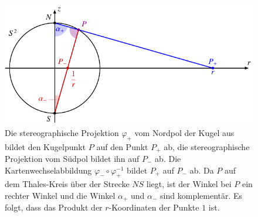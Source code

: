 %
%
%
\begin{figure}
\centering
\includegraphics{chapters/020-koordinaten/images/stereowechsel.pdf}
\caption{Die stereographische Projektion $\varphi_+$ vom Nordpol
der Kugel aus bildet den Kugelpunkt $P$ auf den Punkt $P_+$ ab, die 
stereographische Projektion vom Südpol bildet ihn auf $P_-$ ab.
Die Kartenwechselabbildung $\varphi_-\circ\varphi_+^{-1}$ bildet $P_+$
auf $P_-$ ab.
Da $P$ auf dem Thales-Kreis über der Strecke $NS$ liegt, ist der Winkel
bei $P$ ein rechter Winkel und die Winkel $\alpha_+$ und $\alpha_-$
sind komplementär.
Es folgt, dass das Produkt der $r$-Koordinaten der Punkte $1$ ist.
\label{buch:koordinaten:diffmannig:fig:stereowechsel}}
\end{figure}
